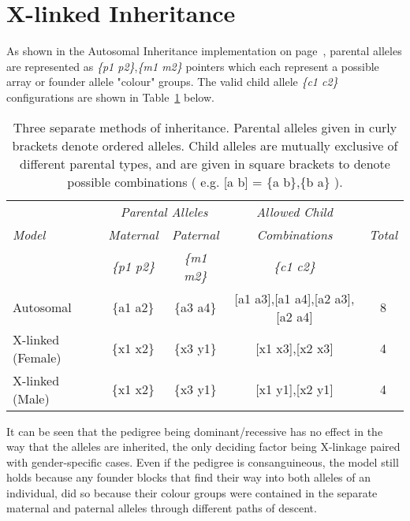 \section{X-linked Inheritance}

As shown in the Autosomal Inheritance implementation on page~\pageref{ref:haplo:aim}, parental alleles are represented as \textit{\{p1 p2\}},\textit{\{m1 m2\}} pointers which each represent a possible array or founder allele "colour" groups. The valid child allele \textit{\{c1 c2\}} configurations are shown in Table~\ref{table:haplo:methofinh} below.

\begin{table}[h]
\begin{center}
\begin{tabular}{ l *4c } \toprule
             & \multicolumn{2}{c}{\emph{Parental Alleles}} & \emph{Allowed Child} &              \\
\emph{Model} & \emph{Maternal}  & \emph{Paternal}  &        \emph{Combinations}   & \emph{Total} \\
             & \emph{\{p1 p2\}} & \emph{\{m1 m2\}} &        \emph{\{c1 c2\}}      &              \\
\midrule
Autosomal         & \{a1 a2\} & \{a3 a4\} & [a1 a3],[a1 a4],[a2 a3],[a2 a4] & 8 \\
X-linked (Female) & \{x1 x2\} & \{x3 y1\} & [x1 x3],[x2 x3]                 & 4 \\
X-linked (Male)   & \{x1 x2\} & \{x3 y1\} & [x1 y1],[x2 y1]                 & 4 \\
\hline
\end{tabular}
\end{center}
\caption[Three means of allele inheritance]{Three separate methods of inheritance. Parental alleles given in curly brackets denote ordered alleles. Child alleles are mutually exclusive of different parental types, and are given in square brackets to denote possible combinations ( e.g. [a b] = \{a b\},\{b a\} ).}\label{table:haplo:methofinh}
\end{table}

It can be seen that the pedigree being dominant/recessive has no effect in the way that the alleles are inherited, the only deciding factor being X-linkage paired with gender-specific cases. Even if the pedigree is consanguineous, the model still holds because any founder blocks that find their way into both alleles of an individual, did so because their colour groups were contained in the separate maternal and paternal alleles through different paths of descent.


